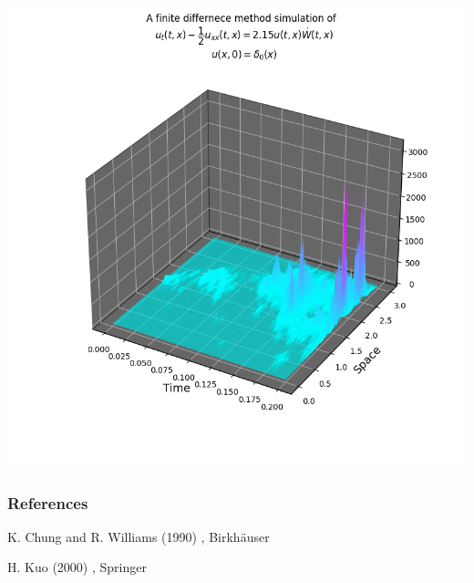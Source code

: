 \documentclass{beamer}%
\numberwithin{equation}{section}
\begin{document}
\begin{frame}
	\centering
	\includegraphics[scale=.5]{SHEdeltaNoise2.15.png}
\end{frame}

	\begin{frame}
		\frametitle{References}
		\small
		
		\begin{thebibliography}{999}
			K. Chung and R. Williams (1990)
			, Birkh\"auser
			
			H. Kuo (2000)
			, Springer
		\end{thebibliography}
	\end{frame}
\end{document}
